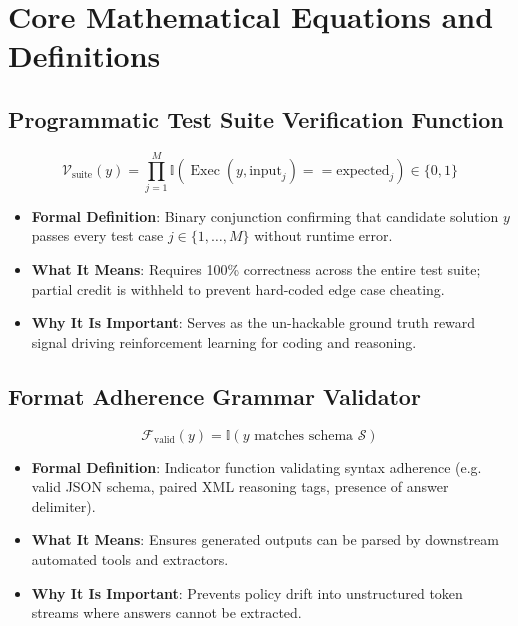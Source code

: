 \documentclass[11pt,a4paper]{article}
\theoremstyle{definition}
\begin{document}
\section{Core Mathematical Equations and Definitions}

\subsection{Programmatic Test Suite Verification Function}
{\boldmath
\begin{equation}
\mathcal{V}_{\text{suite}}(y) = \prod_{j=1}^M \mathbb{I}\left( \operatorname{Exec}(y, \text{input}_j) == \text{expected}_j \right) \in \{0, 1\}
\end{equation}
}
\begin{itemize}
    \item \textbf{Formal Definition}: Binary conjunction confirming that candidate solution $y$ passes every test case $j \in \{1, \dots, M\}$ without runtime error.
    \item \textbf{What It Means}: Requires 100\% correctness across the entire test suite; partial credit is withheld to prevent hard-coded edge case cheating.
    \item \textbf{Why It Is Important}: Serves as the un-hackable ground truth reward signal driving reinforcement learning for coding and reasoning.
\end{itemize}

\subsection{Format Adherence Grammar Validator}
{\boldmath
\begin{equation}
\mathcal{F}_{\text{valid}}(y) = \mathbb{I}\left( y \text{ matches schema } \mathcal{S} \right)
\end{equation}
}
\begin{itemize}
    \item \textbf{Formal Definition}: Indicator function validating syntax adherence (e.g. valid JSON schema, paired XML reasoning tags, presence of answer delimiter).
    \item \textbf{What It Means}: Ensures generated outputs can be parsed by downstream automated tools and extractors.
    \item \textbf{Why It Is Important}: Prevents policy drift into unstructured token streams where answers cannot be extracted.
\end{itemize}
\end{document}
